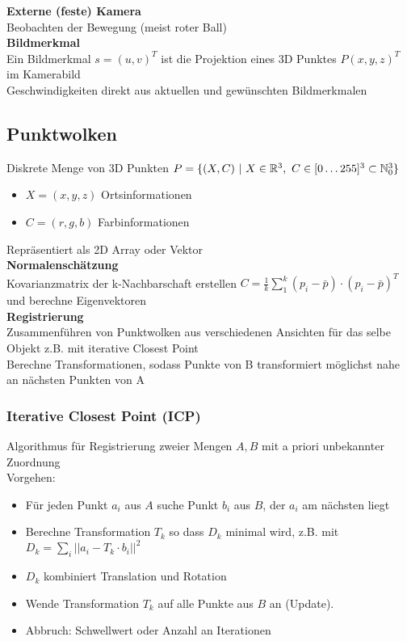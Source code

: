 \textbf{Externe (feste) Kamera}\\
Beobachten der Bewegung (meist roter Ball)\\

\textbf{Bildmerkmal}\\
Ein Bildmerkmal \(s = (u,v)^T\) ist die Projektion eines 3D Punktes \(P (x, y, z)^T\) im Kamerabild\\
Geschwindigkeiten direkt aus aktuellen und gewünschten Bildmerkmalen\\

\subsection{Punktwolken}
Diskrete Menge von 3D Punkten \(P = \{(X, C)\ |\ X \in \mathbb{R}^3,\ C \in [0 \ldots 255]^3 \subset \mathbb{N}^3_0\}\)
\begin{itemize}
\item \(X = (x, y, z)\) Ortsinformationen
\item \(C = (r, g, b)\) Farbinformationen
\end{itemize}
Repräsentiert als 2D Array oder Vektor\\

\textbf{Normalenschätzung}\\
Kovarianzmatrix der k-Nachbarschaft erstellen \(C = \frac{1}{k} \sum_1^k (p_i - \bar{p}) \cdot (p_i - \bar{p})^T\)
und berechne Eigenvektoren\\

\textbf{Registrierung}\\
Zusammenführen von Punktwolken aus verschiedenen Ansichten für das selbe Objekt
z.B. mit iterative Closest Point\\
Berechne Transformationen, sodass Punkte von B transformiert möglichst nahe an nächsten Punkten von A \\

\subsubsection{Iterative Closest Point (ICP)}
Algorithmus für Registrierung zweier Mengen \(A,B\) mit a priori unbekannter Zuordnung\\
Vorgehen:
\begin{itemize}
\item Für jeden Punkt \(a_i\) aus \(A\) suche Punkt \(b_i\) aus \(B\), der \(a_i\) am nächsten liegt
\item Berechne Transformation \(T_k\) so dass \(D_k\) minimal wird, z.B. mit
  \(D_k = \sum_i || a_i - T_k \cdot b_i ||^2\)
\item \(D_k\) kombiniert Translation und Rotation
\item Wende Transformation \(T_k\) auf alle Punkte aus \(B\) an (Update).
\item Abbruch: Schwellwert oder Anzahl an Iterationen
\end{itemize}

